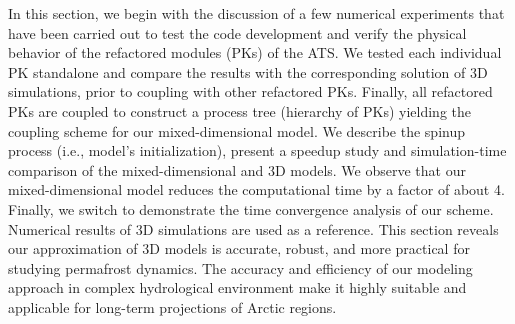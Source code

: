 \documentclass[review]{elsarticle}
\begin{document}
In this section, we begin with the discussion of a few numerical experiments that have been carried out to test the code development and verify the physical behavior of the refactored modules (PKs) of the ATS. We tested each individual PK standalone and compare the results with the corresponding solution of 3D simulations, prior to coupling with other refactored PKs. Finally, all refactored PKs are coupled to construct a process tree (hierarchy of PKs) yielding the coupling scheme for our mixed-dimensional model.
We describe the spinup process (i.e., model's initialization), present a speedup study and simulation-time comparison of the mixed-dimensional and 3D models. We observe that our mixed-dimensional model reduces the computational time by a factor of about 4. Finally, we switch to demonstrate the time convergence analysis of our scheme. Numerical results of 3D simulations are used as a reference. This section reveals our approximation of 3D models is accurate, robust, and more practical for studying permafrost dynamics. The accuracy and efficiency of our modeling approach in complex hydrological environment make it highly suitable and applicable for long-term projections of Arctic regions.
\end{document}
